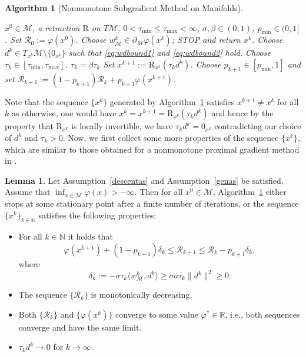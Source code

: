 \documentclass[a4paper, 12pt]{article}
\numberwithin{equation}{section}
\theoremstyle{bolddef}
\newtheorem{algorithm}[definition]{Algorithm}
\theoremstyle{definition}
\theoremstyle{boldplain}
\newtheorem{lemma}[definition]{Lemma}
\newcommand{\xk}{x^k}
\newcommand{\wk}{w^k}
\newcommand{\dk}{d^k}
\newcommand{\tauk}{\tau_k}
\newcommand{\xkp}{x^{k+1}}
\newcommand{\pmin}{p_{\min}}
\newcommand{\taumin}{\tau_\mathrm{min}}
\newcommand{\taumax}{\tau_\mathrm{max}}
\newcommand{\Rvalue}{\mathcal{R}}
\newcommand{\retr}{\mathrm{R}}
\begin{document}
\begin{algorithm}[Nonmonotone Subgradient Method on Manifolds]\leavevmode
	\label{Alg:NonmonotoneSubgradient}
\begin{algorithmic}[1]
	\Require $x^0 \in \mathcal{M}$, a retraction $\retr$ on $T\mathcal{M}$, $0<\tau_\mathrm{min} \leq \taumax < \infty$, $\sigma, \beta \in (0,1)$, $\pmin \in (0, 1]$.
	\State Set $\Rvalue_0 := \varphi(x^0)$.
	\State Choose $\wk_\mathcal{M} \in \partial_\mathcal{M} \varphi(\xk)$; \If{$\wk = 0$} \State STOP and return $\xk$.\EndIf
	\State Choose $\dk \in T_{\xk}\mathcal{M} \setminus \{0_{\xk}\}$ such that \eqref{eq:wdbound1} and \eqref{eq:wdbound2} hold.
	\State Choose $\tau_k \in [\taumin, \taumax]$.
	\While{$\varphi(\retr_{\xk}(\tauk \dk)) > \Rvalue_k + \sigma \tauk \langle \wk_\mathcal{M}, \dk \rangle$}
	\State $\tauk = \beta \tauk$
	\EndWhile
	\State Set $\xkp := \retr_{\xk}(\tauk \dk)$.
	\State Choose $p_{k+1} \in [\pmin, 1]$ and set $\Rvalue_{k+1} := (1-p_{k+1})\Rvalue_k + p_{k+1} \varphi(\xkp)$.
	\EndFor
\end{algorithmic}
\end{algorithm}

Note that the sequence $\{\xk\}$ generated by Algorithm~\ref{Alg:NonmonotoneSubgradient} satisfies $\xkp \neq \xk$ for all $k$ as otherwise, one would have $\xk = \xkp = \retr_{\xk}(\tauk \dk)$ and hence by the property that $\retr_{\xk}$ is locally invertible, we have $\tauk \dk = 0_{\xk}$ contradicting our choice of $\dk$ and $\tauk > 0$. Now, we first collect some more properties of the sequence $\{\xk\}$, which are similar to those obtained for a nonmonotone proximal gradient method in \cite{DeMarchi2023}.

\begin{lemma}\label{lemma:genproperties}
	Let Assumption~\ref{descentas} and Assumption~\ref{genas} be satisfied. Assume that $\inf_{x \in \mathcal{M}} \varphi(x) > - \infty$. Then for all $x^0 \in \mathcal{M}$, Algorithm~\ref{Alg:NonmonotoneSubgradient} either stops at some stationary point after a finite number of iterations, or the sequence $\{\xk\}_{k \in \mathbb{N}}$ satisfies the following properties:
\begin{itemize}
	\item[(a)] For all $k \in \mathbb{N}$ it holds that
		\begin{equation}\label{eq:descentcondition}
			\varphi(\xkp) + (1- p_{k+1}) \delta_k \leq \Rvalue_{k+1} \leq \Rvalue_k - p_{k+1} \delta_k,
		\end{equation}
		where 
		\begin{equation}
			\delta_k := - \sigma \tauk \langle \wk_\mathcal{M}, \dk \rangle \geq \sigma a\tauk \|\dk\|^2 \geq 0.
		\end{equation}
	\item [(b)] The sequence $\{ \Rvalue_k\}$ is monotonically decreasing.
	\item [(c)] Both $\{ \Rvalue_k \}$ and $\{ \varphi(\xk)\}$ converge to some value $\varphi^* \in \mathbb{R}$, i.e., both sequences converge and
	have the same limit.
	\item [(d)] $\tauk \dk \to 0$ for $k \to \infty$.
\end{itemize}
\end{lemma}
\end{document}
